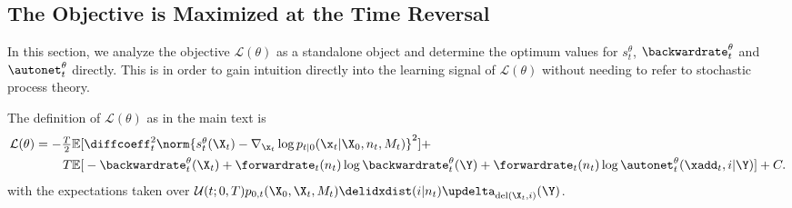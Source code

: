 \subsection{The Objective is Maximized at the Time Reversal}
\label{sec:tddm-ObjTimeRevProof}

\newcommand{\intxz}{\sum_{n_0=1}^N \int_{\x_0 \in \mathbb{R}^{n_0 d}}}

In this section, we analyze the objective $\mathcal{L}(\theta)$ as a standalone object and determine the optimum values for $s_t^\theta$, $\backwardrate_t^\theta$ and $\autonet_t^\theta$ directly. This is in order to gain intuition directly into the learning signal of $\mathcal{L}(\theta)$ without needing to refer to stochastic process theory.

The definition of $\mathcal{L}(\theta)$ as in the main text is
\begin{align}
    \mathcal{L}(\theta) = \textstyle -\frac{T}{2} \mathbb{E}[&\textstyle  \diffcoeff_t^2 \norm{s_t^\theta(\X_t) - \nabla_{\x_t} \log p_{t|0}(\x_t | \X_0, n_t, M_t)   }^2 ] + \\
    T \mathbb{E} [&\textstyle  - \backwardrate_{t}^\theta(\X_t) + \forwardrate_t (n_t) \log \backwardrate_{t}^\theta(\Y) + \forwardrate_t(n_t) \log \autonet_{t}^\theta(\xadd_t, i | \Y) ] + C.
\end{align}
with the expectations taken over $\mathcal{U}(t; 0, T) p_{0,t}(\X_0, \X_t, M_t) \delidxdist(i | n_t) \updelta_{\textup{del}(\X_t, i)} (\Y)$.

